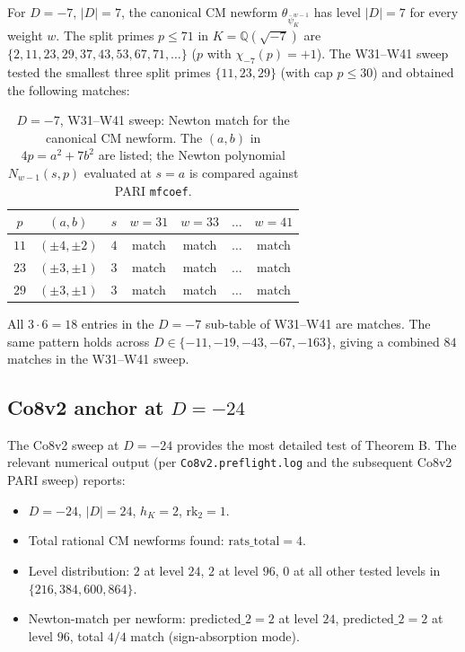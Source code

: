 \documentclass[11pt,a4paper]{amsart}
\theoremstyle{definition}
\newcommand{\Q}{\mathbb{Q}}
\newcommand{\hK}{h_{K}}
\begin{document}
For $D = -7$, $|D| = 7$, the canonical CM newform $\theta_{\bar\psi_K^{w-1}}$ has level $|D| = 7$ for every weight $w$. The split primes $p \le 71$ in $K = \Q(\sqrt{-7})$ are $\{2, 11, 23, 29, 37, 43, 53, 67, 71, \ldots\}$ ($p$ with $\chi_{-7}(p) = +1$). The W31--W41 sweep tested the smallest three split primes $\{11, 23, 29\}$ (with cap $p \le 30$) and obtained the following matches:

\begin{table}[h]
\centering
\caption{$D = -7$, W31--W41 sweep: Newton match for the canonical CM newform. The $(a, b)$ in $4p = a^2 + 7b^2$ are listed; the Newton polynomial $N_{w-1}(s, p)$ evaluated at $s = a$ is compared against PARI \texttt{mfcoef}.}
\label{tab:D7-W31-W41}
\begin{tabular}{ccccccc}
\toprule
$p$ & $(a, b)$ & $s$ & $w = 31$ & $w = 33$ & $\ldots$ & $w = 41$ \\
\midrule
$11$ & $(\pm 4, \pm 2)$ & $4$ & match & match & $\ldots$ & match \\
$23$ & $(\pm 3, \pm 1)$ & $3$ & match & match & $\ldots$ & match \\
$29$ & $(\pm 3, \pm 1)$ & $3$ & match & match & $\ldots$ & match \\
\bottomrule
\end{tabular}
\end{table}

All $3 \cdot 6 = 18$ entries in the $D = -7$ sub-table of W31--W41 are matches. The same pattern holds across $D \in \{-11, -19, -43, -67, -163\}$, giving a combined $84$ matches in the W31--W41 sweep.

\subsection{Co8v2 anchor at $D = -24$}\label{sec:pari-Co8v2}

The Co8v2 sweep at $D = -24$ provides the most detailed test of Theorem B. The relevant numerical output (per \texttt{Co8v2.preflight.log} and the subsequent Co8v2 PARI sweep) reports:
\begin{itemize}[leftmargin=2em]
  \item $D = -24$, $|D| = 24$, $\hK = 2$, $\mathrm{rk}_2 = 1$.
  \item Total rational CM newforms found: $\mathrm{rats\_total} = 4$.
  \item Level distribution: $2$ at level $24$, $2$ at level $96$, $0$ at all other tested levels in $\{216, 384, 600, 864\}$.
  \item Newton-match per newform: $\mathrm{predicted\_2} = 2$ at level $24$, $\mathrm{predicted\_2} = 2$ at level $96$, total $4/4$ match (sign-absorption mode).
\end{itemize}
\end{document}
